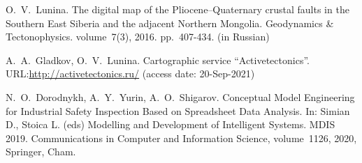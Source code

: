 \documentclass[
]{ceurart}
\begin{document}
\begin{thebibliography}{99}
 O.~V.~Lunina.  The digital map of the Pliocene–Quaternary crustal faults in the Southern East Siberia and the adjacent Northern Mongolia.  Geodynamics \& Tectonophysics.  volume~7(3), 2016.  pp.~407-434. (in Russian) 

 A.~A.~Gladkov, O.~V.~Lunina. Cartographic service ``Activetectonics''. URL:\url{http://activetectonics.ru/} (access date: 20-Sep-2021)

 N.~O.~Dorodnykh, A.~Y.~Yurin, A.~O.~Shigarov. Conceptual Model Engineering for Industrial Safety Inspection Based on Spreadsheet Data Analysis.  In: Simian D., Stoica L. (eds) Modelling and Development of Intelligent Systems.  MDIS 2019.  Communications in Computer and Information Science, volume~1126, 2020, Springer, Cham. 









\end{thebibliography}
\end{document}
